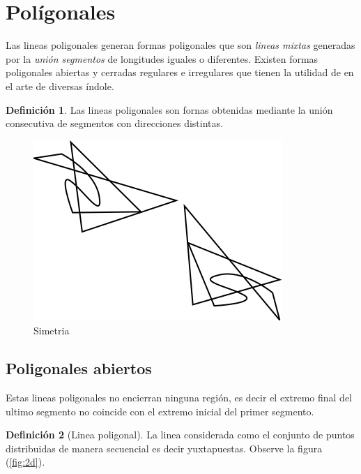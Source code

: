 \documentclass[
  16pt,
]{krantz}
\theoremstyle{definition}
\newtheorem{definition}{Definición}[chapter]
\theoremstyle{definition}
\theoremstyle{definition}
\theoremstyle{definition}
\theoremstyle{remark}
\begin{document}
\hypertarget{poluxedgonales}{%
\section{Polígonales}\label{poluxedgonales}}

Las lineas poligonales generan formas poligonales que son \emph{lineas mixtas} generadas por la \emph{unión segmentos} de longitudes iguales o diferentes. Existen formas poligonales abiertas y cerradas regulares e irregulares que tienen la utilidad de en el arte de diversas índole.

\begin{definition}
\protect\hypertarget{def:poligonal}{}{\label{def:poligonal} }Las lineas poligonales son fornas obtenidas mediante la unión consecutiva de segmentos con direcciones distintas.
\end{definition}

\begin{figure}[!ht]

{\centering \includegraphics{simetria} 

}

\caption{Simetria}\label{fig:simetria}
\end{figure}

\hypertarget{poligonales-abiertos}{%
\subsection{Poligonales abiertos}\label{poligonales-abiertos}}

Estas lineas poligonales no encierran ninguna región, es decir el extremo final del ultimo segmento no coincide con el extremo inicial del primer segmento.

\begin{definition}[Linea poligonal]
\protect\hypertarget{def:poligono}{}{\label{def:poligono} {} }La linea considerada como el conjunto de puntos distribuidas de manera secuencial es decir yuxtapuestas. Observe la figura (\ref{fig:2d}).
\end{definition}
\end{document}
